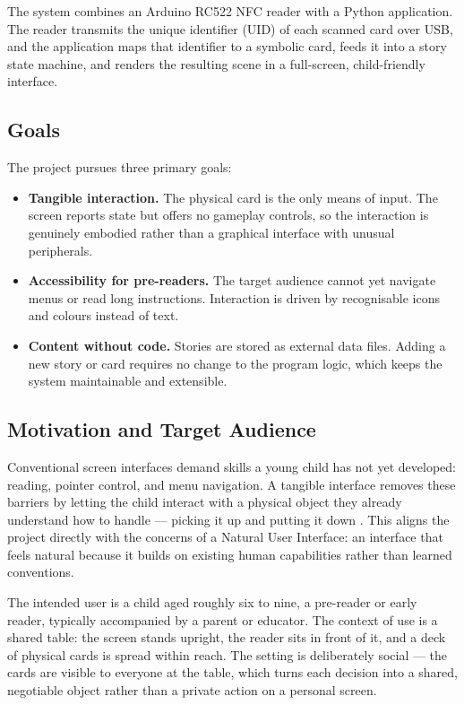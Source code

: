 The system combines an Arduino RC522 NFC reader with a Python application.
The reader transmits the unique identifier (UID) of each scanned card over
USB, and the application maps that identifier to a symbolic card, feeds it
into a story state machine, and renders the resulting scene in a full-screen,
child-friendly interface.

\subsection{Goals}
The project pursues three primary goals:
\begin{itemize}
  \item \textbf{Tangible interaction.} The physical card is the only means of
        input. The screen reports state but offers no gameplay controls, so
        the interaction is genuinely embodied rather than a graphical
        interface with unusual peripherals.
  \item \textbf{Accessibility for pre-readers.} The target audience cannot
        yet navigate menus or read long instructions. Interaction is driven
        by recognisable icons and colours instead of text.
  \item \textbf{Content without code.} Stories are stored as external data
        files. Adding a new story or card requires no change to the program
        logic, which keeps the system maintainable and extensible.
\end{itemize}

\subsection{Motivation and Target Audience}
Conventional screen interfaces demand skills a young child has not yet
developed: reading, pointer control, and menu navigation. A tangible
interface removes these barriers by letting the child interact with a
physical object they already understand how to handle --- picking it up and
putting it down \cite{ishii1997tangible}. This aligns the project directly
with the concerns of a Natural User Interface: an interface that feels
natural because it builds on existing human capabilities rather than
learned conventions.

The intended user is a child aged roughly six to nine, a pre-reader or early
reader, typically accompanied by a parent or educator. The context of use is
a shared table: the screen stands upright, the reader sits in front of it,
and a deck of physical cards is spread within reach. The setting is
deliberately social --- the cards are visible to everyone at the table, which
turns each decision into a shared, negotiable object rather than a private
action on a personal screen.

